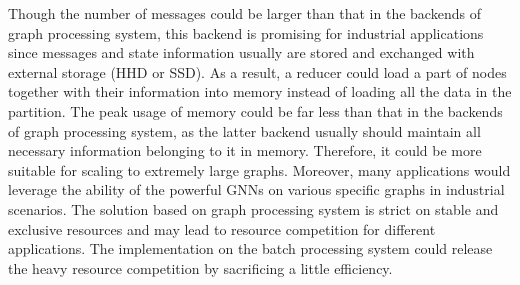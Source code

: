 \documentclass[conference]{IEEEtran}
\begin{document}
Though the number of messages could be larger than that in the backends of graph processing system, %
this backend is promising for industrial applications since messages and state information usually are stored and exchanged with external storage (HHD or SSD).
As a result, a reducer could load a part of nodes together with their information into memory instead of loading all the data in the partition.
The peak usage of memory could be far less than that in the backends of graph processing system, as the latter backend usually should maintain all necessary information belonging to it in memory.
Therefore, it could be more suitable for scaling to extremely large graphs.
Moreover, many applications would leverage the ability of the powerful GNNs on various specific graphs in industrial scenarios.
The solution based on graph processing system is strict on stable and exclusive resources and may lead to resource competition for different applications.
The implementation on the batch processing system could release the heavy resource competition by sacrificing a little efficiency.  

\end{document}
